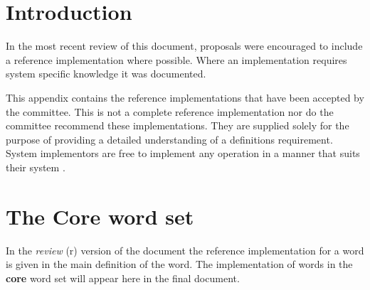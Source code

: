 
\label{annex:implement}

\section{Introduction} %
\label{ref:intro}

In the most recent review of this document, proposals were encouraged
to include a reference implementation where possible.  Where an
implementation requires system specific knowledge it was documented.

This appendix contains the reference implementations that have been
accepted by the committee.  This is not a complete reference
implementation nor do the committee recommend these implementations.
They are supplied solely for the purpose of providing a detailed
understanding of a definitions requirement.  System implementors are
free to implement any operation in a manner that suits their system%
.



\ifinline
	\newcommand{\impsection}[2]{%
		\section{The optional #2 word set}
		\begin{editor}
			In the \emph{review} (r) version of the document the
			reference implementation for a word is given in the main
			definition of the word.  The implementation of words in
			the \textbf{#1} word set will appear here in the final
			document.
		\end{editor}
	}
\else
	\newcommand{\impsection}[2]{%
		\defersection{#2}
		\setwordlist{#1}
		
		\stepsection
	}
\fi

\setcounter{section}{5}
\section{The Core word set}				%
\ifinline
	\begin{editor}
		In the \emph{review} (r) version of the document the
		reference implementation for a word is given in the main
		definition of the word.  The implementation of words
		in the \textbf{core} word set will appear here in the
		final document.
	\end{editor}
\else
	
\fi

